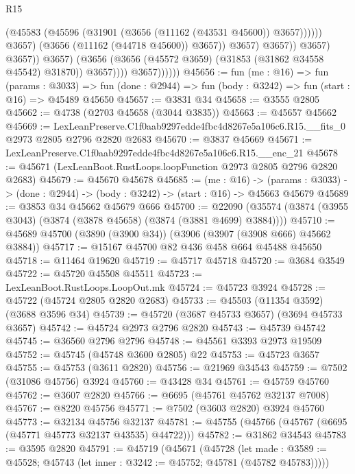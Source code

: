 \begin{lexlean}{R15}
\begin{coremodule}
                                            (@45583
                                              (@45596
                                                (@31901 (@3656 (@11162 (@43531 @45600)) @3657))))))
                                        @3657)
                                      (@3656 (@11162 (@44718 @45600)) @3657))
                                    @3657)
                                  @3657))
                              @3657)
                            @3657))
                        @3657)
                      (@3656 (@3656 (@45572 @3659) (@31853 (@31862 @34558 @45542) @31870)) @3657))))
                @3657))))))
@45656 := fun (me : @16) =>
  fun (params : @3033) =>
  fun (done : @2944) => fun (body : @3242) => fun (start : @16) => @45489 @45650
@45657 := @3831 @34
@45658 := @3555 @2805
@45662 := @4738 (@2703 @45658 (@3044 @3835))
@45663 := @45657 @45662
@45669 := LexLeanPreserve.C1f0aab9297edde4fbc4d8267e5a106c6.R15.__fits_0
    @2973
    @2805
    @2796
    @2820
    @2683
@45670 := @3837 @45669
@45671 := LexLeanPreserve.C1f0aab9297edde4fbc4d8267e5a106c6.R15.__enc_21
@45678 := @45671 (LexLeanBoot.RustLoops.loopFunction @2973 @2805 @2796 @2820 @2683)
@45679 := @45670 @45678
@45685 := (me : @16) ->
  (params : @3033) -> (done : @2944) -> (body : @3242) -> (start : @16) -> @45663 @45679
@45689 := @3853 @34 @45662 @45679 @666
@45700 := @22090 (@35574 (@3874 (@3955 @3043) (@3874 (@3878 @45658) (@3874 (@3881 @4699) @3884))))
@45710 := @45689 @45700 (@3890 (@3900 @34)) (@3906 (@3907 (@3908 @666) @45662 @3884))
@45717 := @15167 @45700 @82 @436 @458 @664 @45488 @45650
@45718 := @11464 @19620
@45719 := @45717 @45718
@45720 := @3684 @3549
@45722 := @45720 @45508 @45511
@45723 := LexLeanBoot.RustLoops.LoopOut.mk
@45724 := @45723 @3924
@45728 := @45722 (@45724 @2805 @2820 @2683)
@45733 := @45503 (@11354 @3592) (@3688 @3596 @34)
@45739 := @45720 (@3687 @45733 @3657) (@3694 @45733 @3657)
@45742 := @45724 @2973 @2796 @2820
@45743 := @45739 @45742
@45745 := @36560 @2796 @2796
@45748 := @45561 @3393 @2973 @19509
@45752 := @45745 (@45748 @3600 @2805) @22
@45753 := @45723 @3657
@45755 := @45753 (@3611 @2820)
@45756 := @21969 @34543
@45759 := @7502 (@31086 @45756) @3924
@45760 := @43428 @34
@45761 := @45759 @45760
@45762 := @3607 @2820
@45766 := @6695 (@45761 @45762 @32137 @7008)
@45767 := @8220 @45756
@45771 := @7502 (@3603 @2820) @3924 @45760
@45773 := @32134 @45756 @32137
@45781 := @45755 (@45766 (@45767 (@6695 (@45771 @45773 @32137 @43535) @44722)))
@45782 := @31862 @34543
@45783 := @3595 @2820
@45791 := @45719
    (@45671
      (@45728
        (let made : @3589 := @45528; @45743 (let inner : @3242 := @45752; @45781 (@45782 @45783)))))

\end{coremodule}
\end{lexlean}
